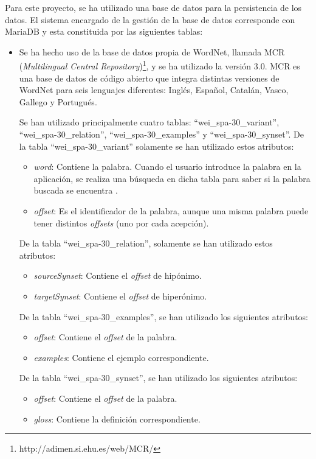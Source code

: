 Para este proyecto, se ha utilizado una base de datos para la persistencia de los datos. El sistema encargado de la gestión de la base de datos corresponde con MariaDB y esta constituida por las siguientes tablas:
\begin{itemize}
	\item Se ha hecho uso de la base de datos propia de WordNet, llamada MCR (\textit{Multilingual Central Repository})\footnote{http://adimen.si.ehu.es/web/MCR/}, y se ha utilizado la versión 3.0.  MCR es una base de datos de código abierto que integra distintas versiones de WordNet para seis lenguajes diferentes: Inglés, Español, Catalán, Vasco, Gallego y Portugués.  
	
	Se han utilizado principalmente cuatro tablas: ``wei\_spa-30\_variant'', ``wei\_spa-30\_relation'', ``wei\_spa-30\_examples'' y ``wei\_spa-30\_synset''. 
	De la tabla ``wei\_spa-30\_variant'' solamente se han utilizado estos atributos:
	\begin{itemize}
		\item \textit{word}: Contiene la palabra. Cuando el usuario introduce la palabra en la aplicación, se realiza una búsqueda en dicha tabla para saber si la palabra buscada se encuentra .
		\item \textit{offset}: Es el identificador de la palabra, aunque una misma palabra puede tener distintos \textit{offsets} (uno por cada acepción). 
	\end{itemize}

	De la tabla ``wei\_spa-30\_relation'', solamente se han utilizado estos atributos:
	\begin{itemize}
		\item \textit{sourceSynset}: Contiene el \textit{offset} de hipónimo.  
		\item \textit{targetSynset}: Contiene el \textit{offset} de hiperónimo.  
	\end{itemize}


	De la tabla ``wei\_spa-30\_examples'', se han utilizado los siguientes atributos:
		\begin{itemize}
		\item \textit{offset}: Contiene el \textit{offset} de la palabra.  
		\item \textit{examples}: Contiene el ejemplo correspondiente.
	\end{itemize}
	
	De la tabla ``wei\_spa-30\_synset'', se han utilizado los siguientes atributos:
	\begin{itemize}
		\item \textit{offset}: Contiene el \textit{offset} de la palabra.  
		\item \textit{gloss}: Contiene la definición correspondiente.
	\end{itemize} 



\end{itemize}
